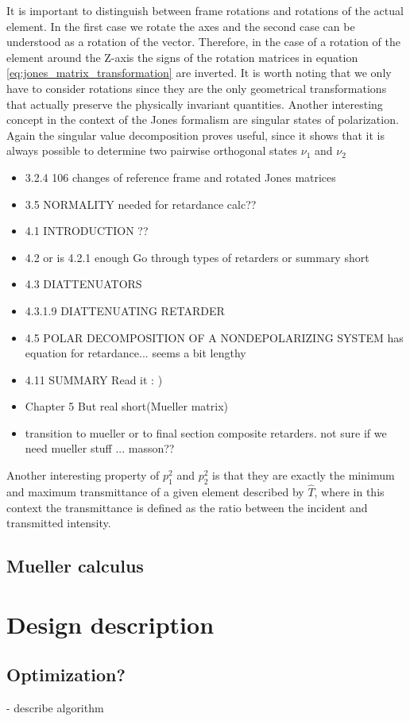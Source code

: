 It is important to distinguish between frame rotations and rotations of the actual element. In the first case we rotate the axes and the second case can be understood as a rotation of the vector. Therefore, in the case of a rotation of the element around the Z-axis the signs of the rotation matrices in equation \ref{eq:jones_matrix_transformation} are inverted. It is worth noting that we only have to consider rotations since they are the only geometrical transformations that actually preserve the physically invariant quantities. Another interesting concept in the context of the Jones formalism are singular states of polarization. Again the singular value decomposition proves useful, since it shows that it is always possible to determine two pairwise orthogonal states $\nu_1$ and $\nu_2$ 

\begin{itemize}
    \item 3.2.4 106 changes of reference frame and rotated Jones matrices
    \item 3.5 NORMALITY needed for retardance calc??
    \item 4.1 INTRODUCTION ??
    \item 4.2 or is 4.2.1 enough Go through types of retarders or summary short
    \item 4.3 DIATTENUATORS
    \item 4.3.1.9 DIATTENUATING RETARDER
    \item 4.5 POLAR DECOMPOSITION OF A NONDEPOLARIZING SYSTEM has equation for retardance... seems a bit lengthy
    \item 4.11 SUMMARY Read it : )
    \item Chapter 5 But real short(Mueller matrix)
    \item transition to mueller or to final section composite retarders. not sure if we need mueller stuff ... masson??
\end{itemize}

Another interesting property of $p_1^2$ and $p_2^2$ is that they are exactly the minimum and maximum transmittance of a given element described by $\hat{T}$, where in this context the transmittance is defined as the ratio between the incident and transmitted intensity. 


\cite{Lu1994HomogeneousMatrices}

\subsection{Mueller calculus}
\label{sec:muellercalc}

\section{Design description}
\label{sec:design}

\subsection{Optimization?}
- describe algorithm
